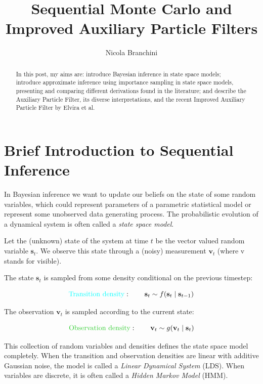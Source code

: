 \documentclass[11pt,a4paper]{article}
\title{Sequential Monte Carlo and Improved Auxiliary Particle Filters}
\author{Nicola Branchini}
\date{}
\begin{document}
\maketitle

\begin{abstract}
In this post, my aims are: introduce Bayesian inference in state space models; introduce approximate inference using importance sampling in state space models, presenting and comparing different derivations found in the literature; and describe the Auxiliary Particle Filter, its diverse interpretations, and the recent Improved Auxiliary Particle Filter by Elvira et al.
\end{abstract}

\tableofcontents

\section{Brief Introduction to Sequential Inference}

In Bayesian inference we want to update our beliefs on the state of some random variables, which could represent parameters of a parametric statistical model or represent some unobserved data generating process. The probabilistic evolution of a dynamical system is often called a \textit{state space model}.

Let the (unknown) state of the system at time $t$ be the vector valued random variable $\mathbf{s}_t$. We observe this state through a (noisy) measurement $\mathbf{v}_t$ (where v stands for visible).

The state $\mathbf{s}_t$ is sampled from some density conditional on the previous timestep:

\begin{equation}
\label{eq:transition}
\textcolor{cyan}{\text{Transition density}}: \qquad \mathbf{s}_t \sim f(\mathbf{s}_t \mid \mathbf{s}_{t-1})
\end{equation}

The observation $\mathbf{v}_t$ is sampled according to the current state:

\begin{equation}
\label{eq:observation}
\textcolor{limegreen}{\text{Observation density}}: \qquad \mathbf{v}_t \sim g(\mathbf{v}_t \mid \mathbf{s}_t)
\end{equation}

This collection of random variables and densities defines the state space model completely. When the transition and observation densities are linear with additive Gaussian noise, the model is called a \textit{Linear Dynamical System} (LDS). When variables are discrete, it is often called a \textit{Hidden Markov Model} (HMM).
\end{document}
